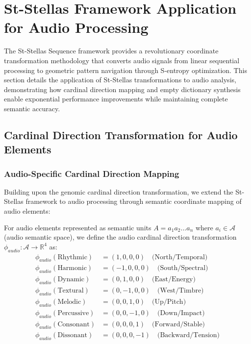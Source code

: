 \section{St-Stellas Framework Application for Audio Processing}

The St-Stellas Sequence framework provides a revolutionary coordinate transformation methodology that converts audio signals from linear sequential processing to geometric pattern navigation through S-entropy optimization. This section details the application of St-Stellas transformations to audio analysis, demonstrating how cardinal direction mapping and empty dictionary synthesis enable exponential performance improvements while maintaining complete semantic accuracy.

\subsection{Cardinal Direction Transformation for Audio Elements}

\subsubsection{Audio-Specific Cardinal Direction Mapping}

Building upon the genomic cardinal direction transformation, we extend the St-Stellas framework to audio processing through semantic coordinate mapping of audio elements:

\begin{definition}
For audio elements represented as semantic units $A = a_1a_2...a_n$ where $a_i \in \mathcal{A}$ (audio semantic space), we define the audio cardinal direction transformation $\phi_{audio}: \mathcal{A} \to \mathbb{R}^4$ as:
\begin{align}
\phi_{audio}(\text{Rhythmic}) &= (1, 0, 0, 0) \quad \text{(North/Temporal)} \\
\phi_{audio}(\text{Harmonic}) &= (-1, 0, 0, 0) \quad \text{(South/Spectral)} \\
\phi_{audio}(\text{Dynamic}) &= (0, 1, 0, 0) \quad \text{(East/Energy)} \\
\phi_{audio}(\text{Textural}) &= (0, -1, 0, 0) \quad \text{(West/Timbre)} \\
\phi_{audio}(\text{Melodic}) &= (0, 0, 1, 0) \quad \text{(Up/Pitch)} \\
\phi_{audio}(\text{Percussive}) &= (0, 0, -1, 0) \quad \text{(Down/Impact)} \\
\phi_{audio}(\text{Consonant}) &= (0, 0, 0, 1) \quad \text{(Forward/Stable)} \\
\phi_{audio}(\text{Dissonant}) &= (0, 0, 0, -1) \quad \text{(Backward/Tension)}
\end{align}
\end{definition}

